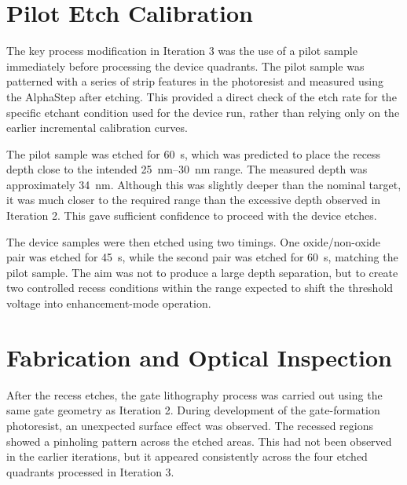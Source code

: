 \section{Pilot Etch Calibration}

The key process modification in Iteration 3 was the use of a pilot sample immediately
before processing the device quadrants. The pilot sample was patterned with a
series of strip features in the photoresist and measured using the AlphaStep after etching. 
This provided a direct check of the etch rate for the specific etchant condition used
for the device run, rather than relying only on the earlier incremental
calibration curves.

\vspace{1mm}

The pilot sample was etched for \SI{60}{\second}, which was predicted to place
the recess depth close to the intended \SIrange{25}{30}{\nano\metre} range. The
measured depth was approximately \SI{34}{\nano\metre}. Although this was
slightly deeper than the nominal target, it was much closer to the required
range than the excessive depth observed in Iteration 2. This gave sufficient
confidence to proceed with the device etches.

\vspace{1mm}

The device samples were then etched using two timings. One oxide/non-oxide pair
was etched for \SI{45}{\second}, while the second pair was etched for
\SI{60}{\second}, matching the pilot sample. The aim was not to produce a large
depth separation, but to create two controlled recess conditions within the
range expected to shift the threshold voltage into enhancement-mode operation.

\section{Fabrication and Optical Inspection}

After the recess etches, the gate lithography process was carried out using the
same gate geometry as Iteration 2. During development of the gate-formation
photoresist, an unexpected surface effect was observed. The recessed regions
showed a pinholing pattern across the etched areas. This had not been observed
in the earlier iterations, but it appeared consistently across the four etched
quadrants processed in Iteration 3.

\vspace{4mm}

